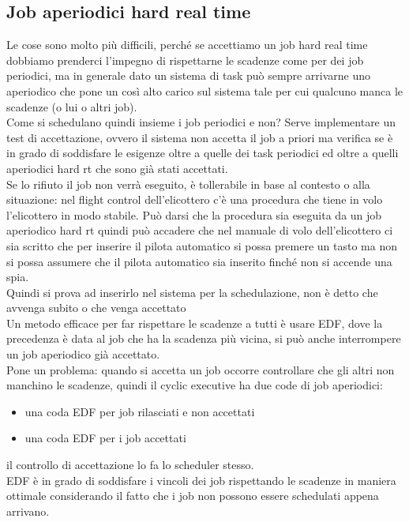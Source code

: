 \documentclass[12pt, oneside]{extbook}
\begin{document}
\subsection{Job aperiodici hard real time}
Le cose sono molto più difficili, perché se accettiamo un job hard real time dobbiamo prenderci l'impegno di rispettarne le scadenze come per dei job periodici, ma in generale dato un sistema di task può sempre arrivarne uno aperiodico che pone un così alto carico sul sistema tale per cui qualcuno manca le scadenze (o lui o altri job).\\
Come si schedulano quindi insieme i job periodici e non? Serve implementare un test di accettazione, ovvero il sistema non accetta il job a priori ma verifica se è in grado di soddisfare le esigenze oltre a quelle dei task periodici ed oltre a quelli aperiodici hard rt che sono già stati accettati.\\
Se lo rifiuto il job non verrà eseguito, è tollerabile in base al contesto o alla situazione: nel flight control dell'elicottero c'è una procedura che tiene in volo l'elicottero in modo stabile. Può darsi che la procedura sia eseguita da un job aperiodico hard rt quindi può accadere che nel manuale di volo dell'elicottero ci sia scritto che per inserire il pilota automatico si possa premere un tasto ma non si possa assumere che il pilota automatico sia inserito finché non si accende una spia.\\
Quindi si prova ad inserirlo nel sistema per la schedulazione, non è detto che avvenga subito o che venga accettato\\
Un metodo efficace per far rispettare le scadenze a tutti è usare EDF, dove la precedenza è data al job che ha la scadenza più vicina, si può anche interrompere un job aperiodico già accettato.\\
Pone un problema: quando si accetta un job occorre controllare che gli altri non manchino le scadenze, quindi il cyclic executive ha due code di job aperiodici:
\begin{itemize}
	\item una coda EDF per job rilasciati e non accettati
	\item una coda EDF per i job accettati
\end{itemize}
il controllo di accettazione lo fa lo scheduler stesso.\\
EDF è in grado di soddisfare i vincoli dei job rispettando le scadenze in maniera ottimale considerando il fatto che i job non possono essere schedulati appena arrivano.\\
\end{document}
